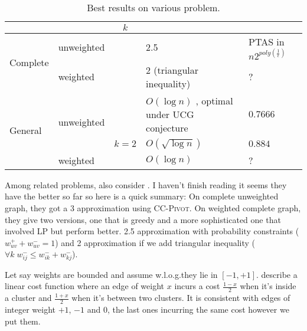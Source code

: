 \begin{table}
\begin{tabularx}{\linewidth}{llcXX}
\toprule
									   &                             & $k$   & \mind{}                                                                                   & \maxa{} \\ \midrule
			 \multirow{2}{*}{Complete} & unweighted                  &       & 2.5 \autocite{Ailon2008}                                                                  & PTAS in $n2^{poly(\frac{1}{\epsilon})}$ \autocite{Giotis2006} \\
\cmidrule(r){4-5}
									   & weighted                    &       & 2 (triangular inequality) \autocite{Ailon2008}                                            & ? \\
			 \midrule
			 \multirow{3}{*}{General}  & \multirow{2}{*}{unweighted} &       & $O(\log n)$ \autocite{Bansal2002}, optimal under UCG conjecture \autocite{Makarychev2014} & $0.7666$ \autocite{Swamy2004} \\
\cmidrule(r){4-5}
									   &  unweighted                 & $k=2$ & $O(\sqrt{\log n})$ \autocite{min2CNF05}                                                   & $0.884$ \autocite{Mitra2009} \\
\cmidrule(r){4-5}
									   & weighted                    &       & $O(\log n)$ \textcite{Demaine2006}                                                        & ? \\
\bottomrule
\end{tabularx}
\caption{Best results on various problem.\label{tab:soa}}
\end{table}

Among related problems, \textcite{Ailon2008} also consider \pcc{}. I haven't
finish reading it seems they have the better so far so here is a quick summary:
On complete unweighted graph, they got a 3 approximation using
\textsc{CC-Pivot}. On weighted complete graph, they give two versions, one
that is greedy and a more sophisticated one that involved LP but perform
better. 2.5 approximation with probability constraints ($w_{uv}^+ + w_{uv}^- =
1$) and 2 approximation if we add triangular inequality ($\forall k\;
w_{ij}^- \leq w_{ik}^- + w_{kj}^-$).

Let say weights are bounded and assume w.l.o.g.\@ they lie in $[-1, +1]$.
\Textcite[Section 7]{Bansal2002} describe a linear cost function where an edge
of weight $x$ incurs a cost $\frac{1-x}{2}$ when it's inside a cluster and
$\frac{1+x}{2}$ when it's between two clusters. It is consistent with edges
of integer weight $+1$, $-1$ and $0$, the last ones incurring the same cost
however we put them.

